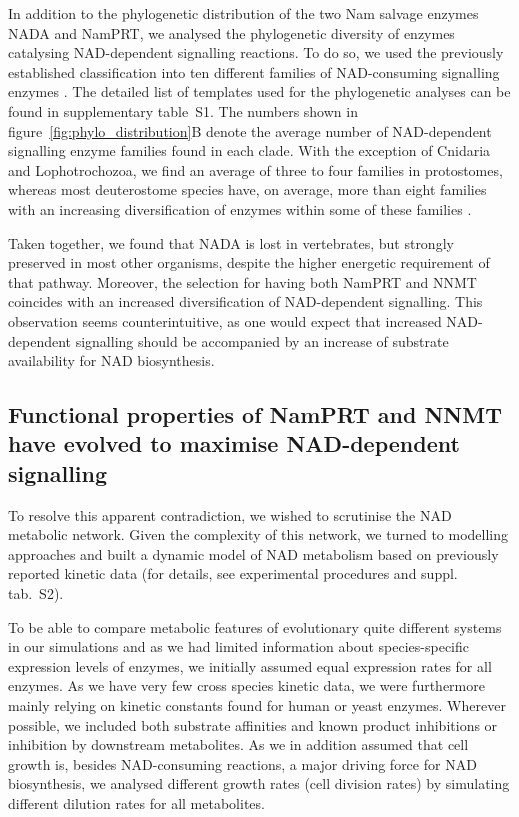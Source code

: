 In addition to the phylogenetic distribution of the two Nam salvage enzymes NADA and NamPRT, we analysed the phylogenetic diversity of enzymes catalysing NAD-dependent signalling reactions. To do so, we used the previously established classification into ten different families of NAD-consuming signalling enzymes \citep{Gossmann2012FEBS}. The detailed list of templates used for the phylogenetic analyses can be found in supplementary table~S1. The numbers shown in figure~\ref{fig:phylo_distribution}B denote the average number of NAD-dependent signalling enzyme families found in each clade. With the exception of Cnidaria and Lophotrochozoa, we find an average of three to four families in protostomes, whereas most deuterostome species have, on average, more than eight families with an increasing diversification of enzymes within some of these families \citep{Gossmann2014DNAR}.

Taken together, we found that NADA is lost in vertebrates, but strongly preserved in most other organisms, despite the higher energetic requirement of that pathway. Moreover, the selection for having both NamPRT and NNMT coincides with an increased diversification of NAD-dependent signalling. This observation seems counterintuitive, as one would expect that increased NAD-dependent signalling should be accompanied by an increase of substrate availability for NAD biosynthesis.


\subsection{Functional properties of NamPRT and NNMT have evolved to maximise NAD-dependent signalling}

To resolve this apparent contradiction, we wished to scrutinise the NAD metabolic network. Given the complexity of this network, we turned to modelling approaches and built a dynamic model of NAD metabolism based on previously reported kinetic data (for details, see experimental procedures and suppl. tab.~S2).

To be able to compare metabolic features of evolutionary quite different systems in our simulations and as we had limited information about species-specific expression levels of enzymes, we initially assumed equal expression rates for all enzymes. As we have very few cross species kinetic data, we were furthermore mainly relying on kinetic constants found for human or yeast enzymes. Wherever possible, we included both substrate affinities and known product inhibitions or inhibition by downstream metabolites. As we in addition assumed that cell growth is, besides NAD-consuming reactions, a major driving force for NAD biosynthesis, we analysed different growth rates (cell division rates) by simulating different dilution rates for all metabolites.

